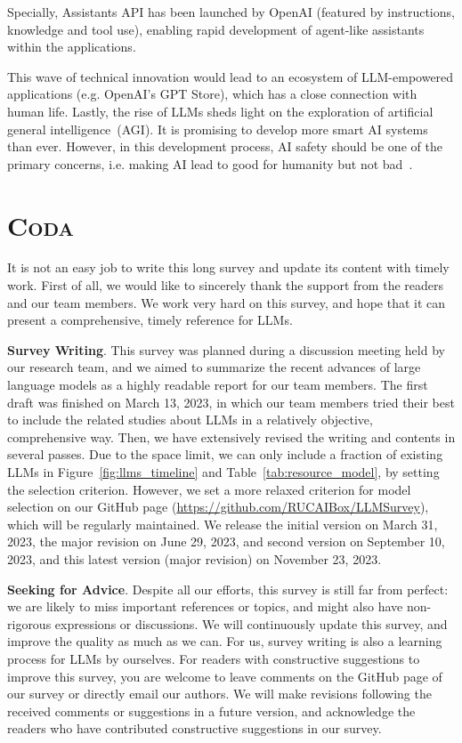 {Specially, Assistants API has been launched by OpenAI (featured by  instructions, knowledge and tool use), enabling rapid development of agent-like assistants within the applications.  

This wave of technical innovation would  lead to an  ecosystem of LLM-empowered applications (e.g. OpenAI’s GPT Store), which has a close connection  with human life. Lastly, the rise of LLMs sheds light on the exploration of artificial general intelligence~(AGI). It is promising to develop more smart AI systems than ever. However, in this development process, AI safety should be one of the primary concerns, i.e. making AI lead to good for humanity but not bad~\cite{OpenAI-blog-2023-Planning}.  

\section*{\textsc{Coda}}
It is not an easy job to write this long survey and update its content with timely work. First of all, we would like to sincerely thank the support from the readers and our team members. We work very hard on this survey, and hope that it can present a comprehensive, timely reference for LLMs. 

\textbf{Survey Writing}. This survey was planned during a   discussion meeting held by our research team, and we aimed to summarize the recent advances of large language models as a highly readable report for our team members. The first draft was finished on March 13, 2023, in which our team members tried their best to include the related studies about LLMs in a relatively  objective, comprehensive way. Then, we have extensively revised the writing and contents in several passes. Due to the space limit, we can only include a fraction of existing  LLMs in Figure~\ref{fig:llms_timeline} and Table~\ref{tab:resource_model}, by setting the selection criterion. However, we set a more relaxed criterion for model selection on our GitHub page (\url{https://github.com/RUCAIBox/LLMSurvey}), which will be regularly maintained. We release the initial version on March 31, 2023,  the major revision on June 29, 2023, and second   version on September 10, 2023, and this latest version (major revision) on November 23,  2023. 

\textbf{Seeking for Advice}. Despite all our efforts, this survey is still far from perfect: we are likely to miss important references or topics, and might also have non-rigorous expressions or discussions. We will continuously update this survey, and improve the quality as much as we can. For us, survey writing is also a learning process for LLMs by ourselves. For readers with constructive suggestions to improve this survey, you are welcome to leave comments on the GitHub page of our survey or directly email our authors. We will make  revisions following the received comments or suggestions in a future version, and acknowledge the readers who have contributed constructive suggestions in our survey.

}
